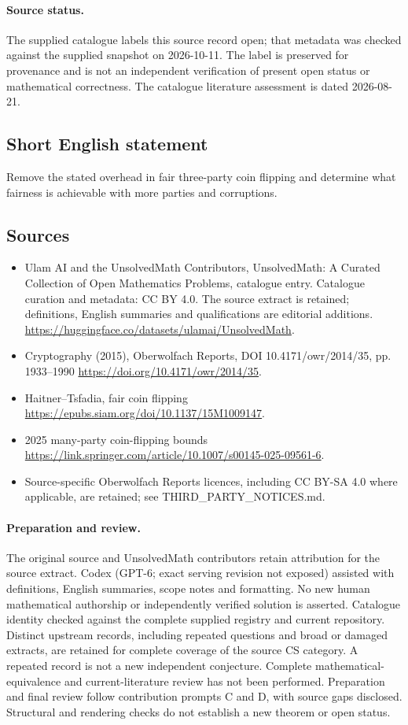 \documentclass[11pt]{article}
\begin{document}
\paragraph{Source status.}
The supplied catalogue labels this source record open; that metadata was checked against the supplied snapshot on 2026-10-11. The label is preserved for provenance and is not an independent verification of present open status or mathematical correctness. The catalogue literature assessment is dated 2026-08-21.
\subsection{Short English statement}
Remove the stated overhead in fair three-party coin flipping and determine what fairness is achievable with more parties and corruptions.
\subsection{Sources}
\begin{itemize}
\item[S1] Ulam AI and the UnsolvedMath Contributors, UnsolvedMath: A Curated Collection of Open Mathematics Problems, catalogue entry. Catalogue curation and metadata: CC BY 4.0. The source extract is retained; definitions, English summaries and qualifications are editorial additions.
\url{https://huggingface.co/datasets/ulamai/UnsolvedMath}.
\item[S2] Cryptography (2015), Oberwolfach Reports, DOI 10.4171/owr/2014/35, pp. 1933--1990
\url{https://doi.org/10.4171/owr/2014/35}.
\item[S3] Haitner--Tsfadia, fair coin flipping
\url{https://epubs.siam.org/doi/10.1137/15M1009147}.
\item[S4] 2025 many-party coin-flipping bounds
\url{https://link.springer.com/article/10.1007/s00145-025-09561-6}.
\item Source-specific Oberwolfach Reports licences, including CC BY-SA 4.0 where applicable, are retained; see THIRD\_PARTY\_NOTICES.md.
\end{itemize}
\paragraph{Preparation and review.}
The original source and UnsolvedMath contributors retain attribution for the source extract. Codex (GPT-6; exact serving revision not exposed) assisted with definitions, English summaries, scope notes and formatting. No new human mathematical authorship or independently verified solution is asserted. Catalogue identity checked against the complete supplied registry and current repository. Distinct upstream records, including repeated questions and broad or damaged extracts, are retained for complete coverage of the source CS category. A repeated record is not a new independent conjecture. Complete mathematical-equivalence and current-literature review has not been performed. Preparation and final review follow contribution prompts C and D, with source gaps disclosed. Structural and rendering checks do not establish a new theorem or open status.
\label{end:statement}
\end{document}
